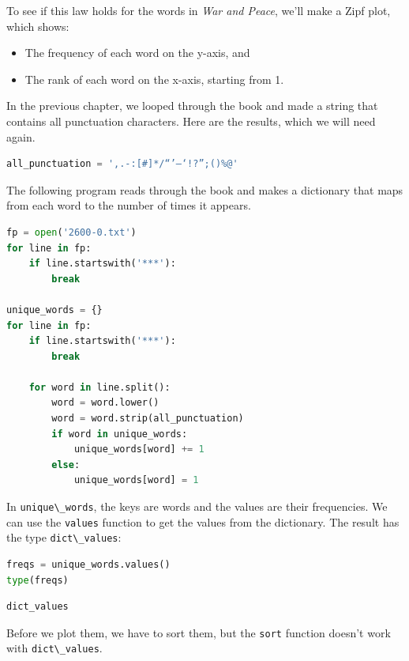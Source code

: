 To see if this law holds for the words in \emph{War and Peace}, we'll
make a Zipf plot, which shows:

\begin{itemize}
\item
  The frequency of each word on the y-axis, and
\item
  The rank of each word on the x-axis, starting from 1.
\end{itemize}

In the previous chapter, we looped through the book and made a string
that contains all punctuation characters. Here are the results, which we
will need again.

\begin{lstlisting}[language=Python,style=source]
all_punctuation = ',.-:[#]*/“’—‘!?”;()%@'
\end{lstlisting}

The following program reads through the book and makes a dictionary that
maps from each word to the number of times it appears.

\begin{lstlisting}[language=Python,style=source]
fp = open('2600-0.txt')
for line in fp:
    if line.startswith('***'):
        break

unique_words = {}
for line in fp:
    if line.startswith('***'):
        break
        
    for word in line.split():
        word = word.lower()
        word = word.strip(all_punctuation)
        if word in unique_words:
            unique_words[word] += 1
        else:
            unique_words[word] = 1
\end{lstlisting}

In \passthrough{\lstinline!unique\_words!}, the keys are words and the
values are their frequencies. We can use the
\passthrough{\lstinline!values!} function to get the values from the
dictionary. The result has the type
\passthrough{\lstinline!dict\_values!}:

\begin{lstlisting}[language=Python,style=source]
freqs = unique_words.values()
type(freqs)
\end{lstlisting}

\begin{lstlisting}[style=output]
dict_values
\end{lstlisting}

Before we plot them, we have to sort them, but the
\passthrough{\lstinline!sort!} function doesn't work with
\passthrough{\lstinline!dict\_values!}.

